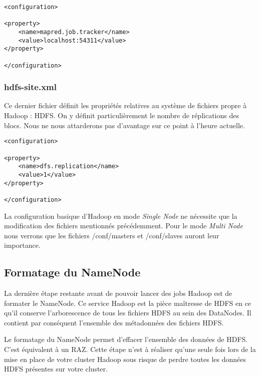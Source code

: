 \begin{verbatim}
<configuration>

<property>
	<name>mapred.job.tracker</name>
    <value>localhost:54311</value>
</property>

</configuration>
\end{verbatim}

\subsubsection{hdfs-site.xml}

\par Ce dernier fichier définit les propriétés relatives au système de fichiers propre à Hadoop : HDFS. On y définit particulièrement le nombre de réplications des blocs. Nous ne nous attarderons pas d'avantage sur ce point à l'heure actuelle.

\begin{verbatim}
<configuration>

<property>
	<name>dfs.replication</name>
	<value>1</value>
</property>

</configuration>
\end{verbatim}

\par La configuration basique d'Hadoop en mode \textit{Single Node} ne nécessite que la modification des fichiers mentionnés précédemment. Pour le mode \textit{Multi Node} nous verrons que les fichiers /conf/masters et /conf/slaves auront leur importance.

\subsection{Formatage du NameNode}

\par La dernière étape restante avant de pouvoir lancer des jobs Hadoop est de formater le NameNode. Ce service Hadoop est la pièce maîtresse de HDFS en ce qu'il conserve l'arborescence de tous les fichiers HDFS au sein des DataNodes. Il contient par conséquent l'ensemble des métadonnées des fichiers HDFS.

\par Le formatage du NameNode permet d'effacer l'ensemble des données de HDFS. C'est équivalent à un RAZ. Cette étape n'est à réaliser qu'une seule fois lors de la mise en place de votre cluster Hadoop sous risque de perdre toutes les données HDFS présentes sur votre cluster.

